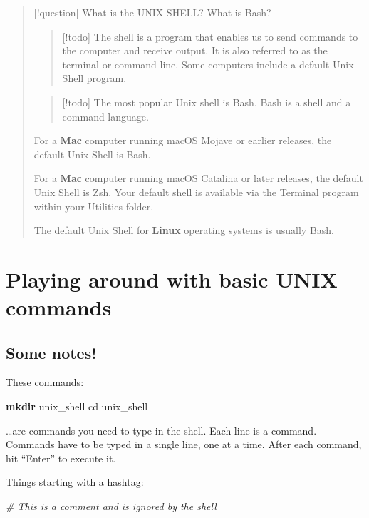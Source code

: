 \documentclass[
]{book}
\newenvironment{Shaded}{\begin{snugshade}}{\end{snugshade}}
\newcommand{\BuiltInTok}[1]{#1}
\newcommand{\CommentTok}[1]{\textcolor[rgb]{0.56,0.35,0.01}{\textit{#1}}}
\newcommand{\FunctionTok}[1]{\textcolor[rgb]{0.13,0.29,0.53}{\textbf{#1}}}
\newcommand{\NormalTok}[1]{#1}
\begin{document}
\begin{quote}
{[}!question{]} What is the UNIX SHELL? What is Bash?

\begin{quote}
{[}!todo{]} The shell is a program that enables us to send commands to the computer and receive output. It is also referred to as the terminal or command line. Some computers include a default Unix Shell program.
\end{quote}

\begin{quote}
{[}!todo{]} The most popular Unix shell is Bash, Bash is a shell and a command language.
\end{quote}

For a \textbf{Mac} computer running macOS Mojave or earlier releases, the default Unix Shell is Bash.

For a \textbf{Mac} computer running macOS Catalina or later releases, the default Unix Shell is Zsh. Your default shell is available via the Terminal program within your Utilities folder.

The default Unix Shell for \textbf{Linux} operating systems is usually Bash.
\end{quote}

\section{Playing around with basic UNIX commands}\label{playing-around-with-basic-unix-commands}

\subsection{Some notes!}\label{some-notes}

These commands:

\begin{Shaded}
\begin{Highlighting}[]
\FunctionTok{mkdir}\NormalTok{ unix\_shell}
\BuiltInTok{cd}\NormalTok{ unix\_shell}
\end{Highlighting}
\end{Shaded}

\ldots are commands you need to type in the shell.
Each line is a command.
Commands have to be typed in a single line, one at a time.
After each command, hit ``Enter'' to execute it.

Things starting with a hashtag:

\begin{Shaded}
\begin{Highlighting}[]
\CommentTok{\# This is a comment and is ignored by the shell}
\end{Highlighting}
\end{Shaded}
\end{document}
